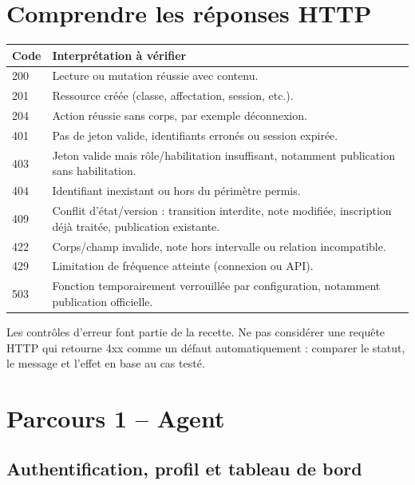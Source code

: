 \documentclass[10pt,a4paper]{article}
\begin{document}
\section{Comprendre les réponses HTTP}

\begin{center}
\begin{tabularx}{\linewidth}{lX}
\toprule
Code & Interprétation à vérifier \\
\midrule
200 & Lecture ou mutation réussie avec contenu. \\
201 & Ressource créée (classe, affectation, session, etc.). \\
204 & Action réussie sans corps, par exemple déconnexion. \\
401 & Pas de jeton valide, identifiants erronés ou session expirée. \\
403 & Jeton valide mais rôle/habilitation insuffisant, notamment publication sans habilitation. \\
404 & Identifiant inexistant ou hors du périmètre permis. \\
409 & Conflit d’état/version : transition interdite, note modifiée, inscription déjà traitée, publication existante. \\
422 & Corps/champ invalide, note hors intervalle ou relation incompatible. \\
429 & Limitation de fréquence atteinte (connexion ou API). \\
503 & Fonction temporairement verrouillée par configuration, notamment publication officielle. \\
\bottomrule
\end{tabularx}
\end{center}

Les contrôles d’erreur font partie de la recette. Ne pas considérer une requête HTTP qui retourne 4xx comme un défaut automatiquement : comparer le statut, le message et l’effet en base au cas testé.

\section{Parcours 1 -- Agent}

\subsection{Authentification, profil et tableau de bord}
\end{document}
